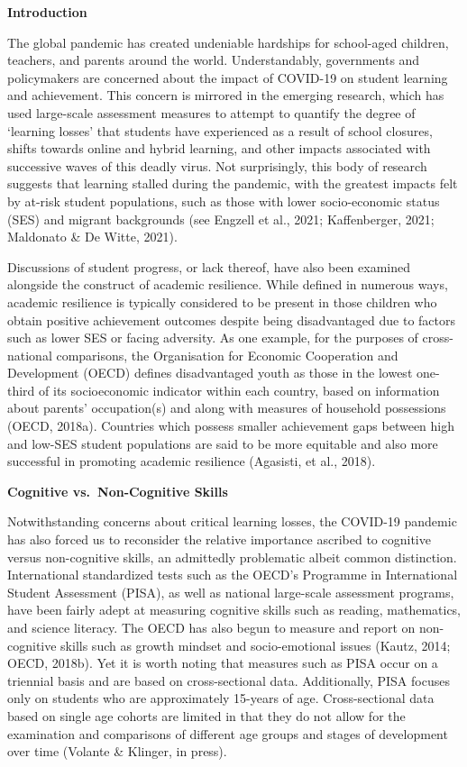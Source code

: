 \documentclass[
]{book}
\begin{document}
\textbf{Introduction}

The global pandemic has created undeniable hardships for school-aged children, teachers, and parents around the world. Understandably, governments and policymakers are concerned about the impact of COVID-19 on student learning and achievement. This concern is mirrored in the emerging research, which has used large-scale assessment measures to attempt to quantify the degree of `learning losses' that students have experienced as a result of school closures, shifts towards online and hybrid learning, and other impacts associated with successive waves of this deadly virus. Not surprisingly, this body of research suggests that learning stalled during the pandemic, with the greatest impacts felt by at-risk student populations, such as those with lower socio-economic status (SES) and migrant backgrounds (see Engzell et al., 2021; Kaffenberger, 2021; Maldonato \& De Witte, 2021).

Discussions of student progress, or lack thereof, have also been examined alongside the construct of academic resilience. While defined in numerous ways, academic resilience is typically considered to be present in those children who obtain positive achievement outcomes despite being disadvantaged due to factors such as lower SES or facing adversity. As one example, for the purposes of cross-national comparisons, the Organisation for Economic Cooperation and Development (OECD) defines disadvantaged youth as those in the lowest one-third of its socioeconomic indicator within each country, based on information about parents' occupation(s) and along with measures of household possessions (OECD, 2018a). Countries which possess smaller achievement gaps between high and low-SES student populations are said to be more equitable and also more successful in promoting academic resilience (Agasisti, et al., 2018).

\textbf{Cognitive vs.~Non-Cognitive Skills}

Notwithstanding concerns about critical learning losses, the COVID-19 pandemic has also forced us to reconsider the relative importance ascribed to cognitive versus non-cognitive skills, an admittedly problematic albeit common distinction. International standardized tests such as the OECD's Programme in International Student Assessment (PISA), as well as national large-scale assessment programs, have been fairly adept at measuring cognitive skills such as reading, mathematics, and science literacy. The OECD has also begun to measure and report on non- cognitive skills such as growth mindset and socio-emotional issues (Kautz, 2014; OECD, 2018b). Yet it is worth noting that measures such as PISA occur on a triennial basis and are based on cross-sectional data. Additionally, PISA focuses only on students who are approximately 15-years of age. Cross-sectional data based on single age cohorts are limited in that they do not allow for the examination and comparisons of different age groups and stages of development over time (Volante \& Klinger, in press).
\end{document}

